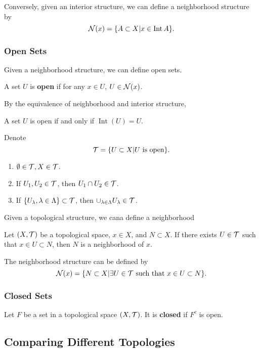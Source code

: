 Conversely, given an interior structure, we can define a neighborhood structure by
$$\mathcal{N}(x)=\{A\subset X|x\in\operatorname{Int}{A}\}.$$


\subsubsection{Open Sets}

Given a neighborhood structure, we can define open sets. 
\begin{definition}[Open]
    A set $U$ is \textbf{open} if for any $x\in U$, $U\in\mathcal{N}(x)$.
\end{definition}
By the equivalence of neighborhood and interior structure,
\begin{proposition}
    A set $U$ is open if and only if $\operatorname{Int}(U)=U$.
\end{proposition}
Denote $$\mathcal{T}=\{U\subset X|U \text{ is open}\}.$$

\begin{enumerate}[label=(\roman*)]
    \item $\emptyset\in\mathcal{T},X\in\mathcal{T}$.
    \item If $U_1,U_2\in\mathcal{T}$, then $U_1\cap U_2\in\mathcal{T}$.
    \item If $\{U_\lambda,\lambda\in\Lambda\}\subset\mathcal{T}$, then $\cup_{\lambda\in\Lambda}U_\lambda\in\mathcal{T}$.
\end{enumerate}

Given a topological structure, we cana define a neighborhood
\begin{definition}
    Let $(X,\mathcal{T})$ be a topological space, $x\in X$, and $N\subset X$.
    If there exists $U\in\mathcal{T}$ such that $x\in U\subset N$, then $N$ is a neighborhood of $x$.
\end{definition}
The neighborhood structure can be defined by $$\mathcal{N}(x)=\{N\subset X|\exists U\in\mathcal{T}\text{ such that }x\in U \subset N\}.$$

\subsubsection{Closed Sets}
\begin{definition}[Closed]
    Let $F$ be a set in a topological space $(X,\mathcal{T})$.
    It is \textbf{closed} if $F^c$ is open.
\end{definition}

\subsection{Comparing Different Topologies}

